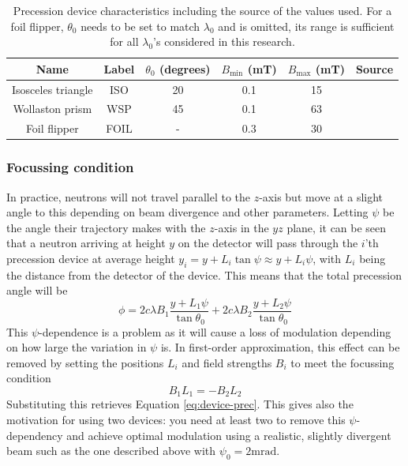 \documentclass{article}
\begin{document}
\begin{table}[h!]
	\centering
	\begin{tabular}{|c|c|c|c|c|c|}
		\hline
		Name & Label & $\theta_0$ (degrees) & $B_{\text{min}}$ (mT) & $B_{\text{max}}$ (mT) & Source \\
		\hline
		Isosceles triangle & ISO & 20 & 0.1 & 15 & \cite{kusmin2017} \\
		Wollaston prism & WSP & 45 & 0.1 & 63 & \cite{li2021} \\
		Foil flipper & FOIL & - & 0.3 & 30 & \cite{bouwman2011} \\
		\hline
	\end{tabular}
	\caption{Precession device characteristics including the source of the values used. For a foil flipper, $\theta_0$ needs to be set to match $\lambda_0$ and is omitted, its range is sufficient for all $\lambda_0$'s considered in this research.}
	\label{tab:device-properties}
\end{table}
\subsubsection{Focussing condition}
In practice, neutrons will not travel parallel to the $z$-axis but move at a slight angle to this depending on beam divergence and other parameters. Letting $\psi$ be the angle their trajectory makes with the $z$-axis in the $yz$ plane, it can be seen that a neutron arriving at height $y$ on the detector will pass through the $i$'th precession device at average height $y_i = y + L_i\tan\psi \approx y + L_i\psi$, with $L_i$ being the distance from the detector of the device. This means that the total precession angle will be
$$\phi = 2c\lambda B_1\frac{y + L_1\psi}{\tan\theta_0} + 2c\lambda B_2\frac{y + L_2\psi}{\tan\theta_0}$$
This $\psi$-dependence is a problem as it will cause a loss of modulation depending on how large the variation in $\psi$ is. In first-order approximation, this effect can be removed by setting the positions $L_i$ and field strengths $B_i$ to meet the focussing condition
$$B_1L_1 = -B_2L_2$$
Substituting this retrieves Equation \eqref{eq:device-prec}. This gives also the motivation for using two devices: you need at least two to remove this $\psi$-dependency and achieve optimal modulation using a realistic, slightly divergent beam such as the one described above with $\psi_0 = 2\unit{\milli\radian}$.
\end{document}

